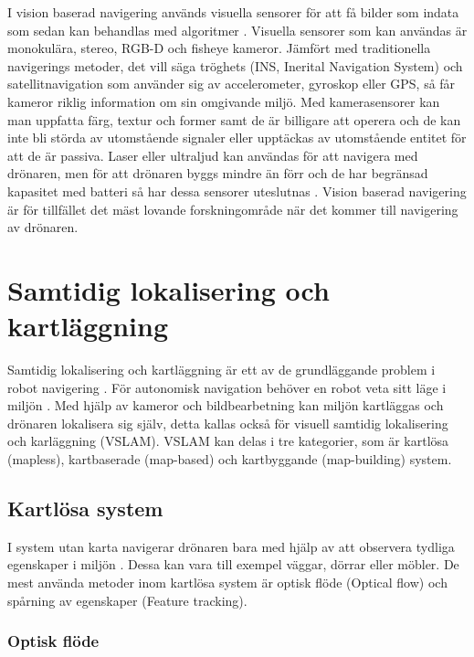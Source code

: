 I vision baserad navigering används visuella sensorer för att få bilder som indata som sedan kan behandlas med algoritmer \citep{geospatial}. Visuella sensorer som kan användas är monokulära, stereo, RGB-D och fisheye kameror. Jämfört med traditionella navigerings metoder, det vill säga tröghets (INS, Inerital Navigation System) och satellitnavigation som använder sig av accelerometer, gyroskop eller GPS, så får kameror riklig information om sin omgivande miljö. Med kamerasensorer kan man uppfatta färg, textur och former samt de är billigare att operera och de kan inte bli störda av utomstående signaler eller upptäckas av utomstående entitet för att de är passiva. Laser eller ultraljud kan användas för att navigera med drönaren, men för att drönaren byggs mindre än förr och de har begränsad kapasitet med batteri så har dessa sensorer uteslutnas \citep{geospatial, 6385934}. Vision baserad navigering är för tillfället det mäst lovande forskningområde när det kommer till navigering av drönaren.

\chapter{Samtidig lokalisering och kartläggning}

Samtidig lokalisering och kartläggning är ett av de grundläggande problem i robot navigering \citep{slamproblem}. För autonomisk navigation behöver en robot veta sitt läge i miljön \citep{geospatial}. Med hjälp av kameror och bildbearbetning kan miljön kartläggas och drönaren lokalisera sig själv, detta kallas också för visuell samtidig lokalisering och karläggning (VSLAM). VSLAM kan delas i tre kategorier, som är kartlösa (mapless), kartbaserade (map-based) och kartbyggande (map-building) system. 

\section{Kartlösa system}

I system utan karta navigerar drönaren bara med hjälp av att observera tydliga egenskaper i miljön \citep{982903}. Dessa kan vara till exempel väggar, dörrar eller möbler. De mest använda metoder inom kartlösa system är optisk flöde (Optical flow) och spårning av egenskaper (Feature tracking). 

\subsection{Optisk flöde}

